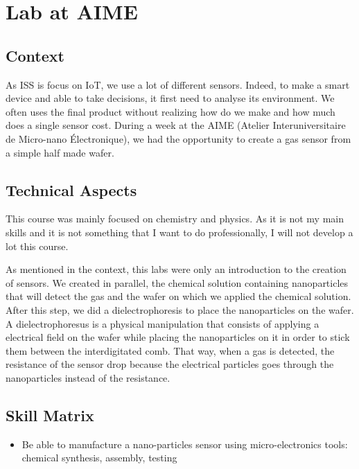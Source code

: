 \section{Lab at AIME}

\subsection{Context}

As ISS is focus on IoT, we use a lot of different sensors. Indeed, to make a smart device and able to take decisions, it first need to analyse its environment. We often uses the final product without realizing how do we make and how much does a single sensor cost. During a week at the AIME (Atelier Interuniversitaire de Micro-nano Électronique), we had the opportunity to create a gas sensor from a simple half made wafer.

\subsection{Technical Aspects}

This course was mainly focused on chemistry and physics. As it is not my main skills and it is not something that I want to do professionally, I will not develop a lot this course. 
\\\par

As mentioned in the context, this labs were only an introduction to the creation of sensors. We created in parallel, the chemical solution containing nanoparticles that will detect the gas and the wafer on which we applied the chemical solution. After this step, we did a dielectrophoresis to place the nanoparticles on the wafer. A dielectrophoresus is a physical manipulation that consists of applying a electrical field on the wafer while placing the nanoparticles on it in order to stick them between the interdigitated comb. That way, when a gas is detected, the resistance of the sensor drop because the electrical particles goes through the nanoparticles instead of the resistance. 

\subsection{Skill Matrix}

\begin{itemize}
    \item Be able to manufacture a nano-particles sensor using micro-electronics tools: chemical synthesis, assembly, testing 
\end{itemize}

